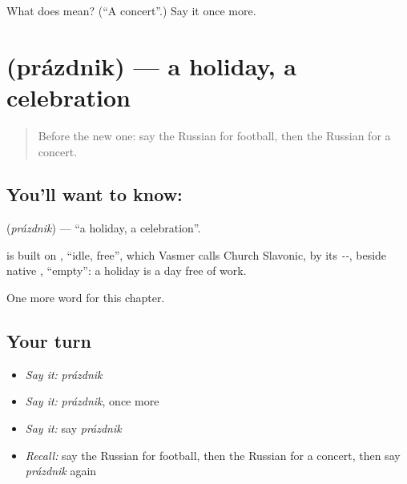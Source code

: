 \begin{tcolorbox}[breakable,colback=teal!4,colframe=teal!35!black,title={Before you move on}]
What does  mean? (\textquotedblleft{}A concert\textquotedblright{}.) Say it once more.
\end{tcolorbox}
\section[\texorpdfstring{\ru{праздник} (prázdnik)}{праздник (prázdnik)}]{ (prázdnik) — a holiday, a celebration}

\label{lesson:RU-C114-holiday}



\begin{quote}
Before the new one: say the Russian for football, then the Russian for a concert.
\end{quote}

\subsection*{You'll want to know: }
\textbf{} (\emph{prázdnik}) — \textquotedblleft{}a holiday, a celebration\textquotedblright{}.

\begin{cousinweb}
\textbf{} is built on \emph{}, \textquotedblleft{}idle, free\textquotedblright{}, which Vasmer calls Church Slavonic, by its \emph{--}, beside native \emph{}, \textquotedblleft{}empty\textquotedblright{}: a holiday is a day free of work.
\end{cousinweb}

\begin{grammarlens}[title={What you've built}]
One more word for this chapter.
\end{grammarlens}

\subsection*{Your turn}
\begin{itemize}
\raggedright
  \item \emph{Say it:} \emph{prázdnik}
  \item \emph{Say it:} \emph{prázdnik}, once more
  \item \emph{Say it:} say \emph{prázdnik}
  \item \emph{Recall:} say the Russian for football, then the Russian for a concert, then say \emph{prázdnik} again
\end{itemize}

